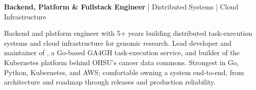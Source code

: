 \begin{center}
    \large\textbf{\textcolor{accent}{Backend, Platform \& Fullstack Engineer}} \textcolor{my-grey}{|} Distributed Systems \textcolor{my-grey}{|} Cloud Infrastructure
\end{center}

\vspace{0.2em}

Backend and platform engineer with 5+ years building distributed task-execution systems and cloud infrastructure for genomic research.
Lead developer and maintainer of , a Go-based GA4GH task-execution service, and builder of the Kubernetes platform behind OHSU's cancer data commons.
Strongest in Go, Python, Kubernetes, and AWS; comfortable owning a system end-to-end, from architecture and roadmap through releases and production reliability.
